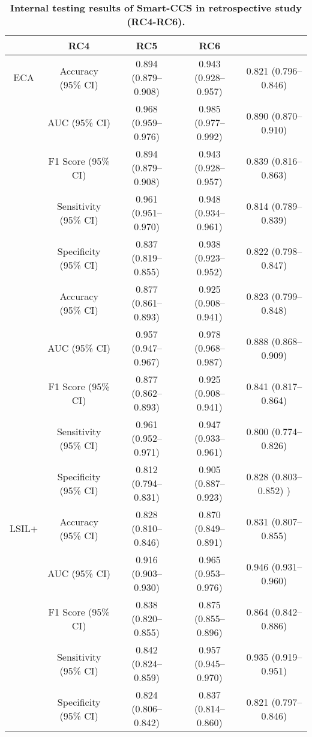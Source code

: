 \clearpage
\begin{table}[h] 
\renewcommand{\arraystretch}{2}
\renewcommand{\tablename}{Extended Data Table.}
\centering 
\caption{\textbf{Internal testing results of Smart-CCS in retrospective study (RC4-RC6).}}
\begin{tabular}{cc|c|c|c} 
\hline
 \rowcolor{cusyellow} \multicolumn{2}{c|}{\multirow{1}{*}{\textbf{
 Metrics}}} & \textbf{RC4} & \textbf{RC5} & \textbf{RC6}\\ 
\hline
\multirow{1}{*}{ECA}&Accuracy (95\% CI) & 0.894 (0.879–0.908) & 0.943 (0.928–0.957) & 0.821 (0.796–0.846)  \\
& AUC (95\% CI) & 0.968 (0.959–0.976) & 0.985 (0.977–0.992) & 0.890 (0.870–0.910) \\
& F1 Score (95\% CI) & 0.894 (0.879–0.908) & 0.943 (0.928–0.957) & 0.839 (0.816–0.863)  \\
& Sensitivity (95\% CI) & 0.961 (0.951–0.970) & 0.948 (0.934–0.961) & 0.814 (0.789–0.839) \\
& Specificity (95\% CI) & 0.837 (0.819–0.855) & 0.938 (0.923–0.952) & 0.822 (0.798–0.847)  \\

 \rowcolor{cusyellowl}  \multirow{1}{*}{ASC-US+ }&Accuracy (95\% CI) & 0.877 (0.861–0.893) & 0.925 (0.908–0.941) & 0.823 (0.799–0.848) \\
 \rowcolor{cusyellowl}  & AUC (95\% CI)  & 0.957 (0.947–0.967) & 0.978 (0.968–0.987) & 0.888 (0.868–0.909)  \\
 \rowcolor{cusyellowl}  & F1 Score (95\% CI)  & 0.877 (0.862–0.893)& 0.925 (0.908–0.941) & 0.841 (0.817–0.864) \\
 \rowcolor{cusyellowl}  & Sensitivity (95\% CI) & 0.961 (0.952–0.971) & 0.947 (0.933–0.961) & 0.800 (0.774–0.826) \\
 \rowcolor{cusyellowl}  & Specificity (95\% CI)   & 0.812 (0.794–0.831)    & 0.905 (0.887–0.923) & 0.828 (0.803–0.852) ) \\

\multirow{1}{*}{LSIL+}&Accuracy (95\% CI) & 0.828 (0.810–0.846) & 0.870 (0.849–0.891) & 0.831 (0.807–0.855) \\
& AUC (95\% CI) & 0.916 (0.903–0.930) & 0.965 (0.953–0.976) & 0.946 (0.931–0.960) \\
& F1 Score (95\% CI) & 0.838 (0.820–0.855)& 0.875 (0.855–0.896) & 0.864 (0.842–0.886)  \\
& Sensitivity (95\% CI)& 0.842 (0.824–0.859) & 0.957 (0.945–0.970) & 0.935 (0.919–0.951) \\
& Specificity (95\% CI) & 0.824 (0.806–0.842) & 0.837 (0.814–0.860) & 0.821 (0.797–0.846) \\


\end{tabular}
\end{table}
